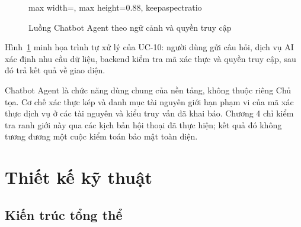 \begin{figure}[H]
\begin{adjustbox}{max width=\textwidth, max height=0.88\textheight, keepaspectratio}
  \end{adjustbox}
  \caption{Luồng Chatbot Agent theo ngữ cảnh và quyền truy cập}
  \label{fig:ch3-13}
\end{figure}

Hình~\ref{fig:ch3-13} minh họa trình tự xử lý của UC-10: người dùng gửi câu hỏi, dịch vụ AI xác định nhu cầu dữ liệu, backend kiểm tra mã xác thực và quyền truy cập, sau đó trả kết quả về giao diện.



Chatbot Agent là chức năng dùng chung của nền tảng, không thuộc riêng Chủ tọa. Cơ chế xác thực kép và danh mục tài nguyên giới hạn phạm vi của mã xác thực dịch vụ ở các tài nguyên và kiểu truy vấn đã khai báo. Chương 4 chỉ kiểm tra ranh giới này qua các kịch bản hội thoại đã thực hiện; kết quả đó không tương đương một cuộc kiểm toán bảo mật toàn diện.

\section{Thiết kế kỹ thuật}

\subsection{Kiến trúc tổng thể}

